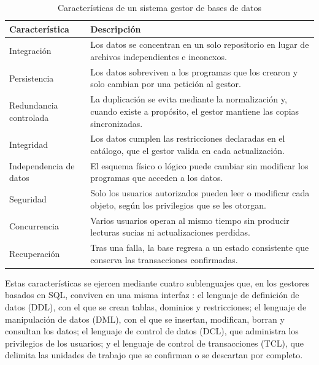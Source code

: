 \begin{table}[H]
    \centering
    \small
    \begin{tabularx}{\textwidth}
        {
            >{\RaggedRight\arraybackslash}p{3.4cm}
            >{\RaggedRight\arraybackslash}X
        }
        \toprule
        \textbf{Característica} & \textbf{Descripción} \\
        \midrule
        Integración & Los datos se concentran en un solo repositorio en lugar de archivos independientes e inconexos. \\
        Persistencia & Los datos sobreviven a los programas que los crearon y solo cambian por una petición al gestor. \\
        Redundancia controlada & La duplicación se evita mediante la normalización y, cuando existe a propósito, el gestor mantiene las copias sincronizadas. \\
        Integridad & Los datos cumplen las restricciones declaradas en el catálogo, que el gestor valida en cada actualización. \\
        Independencia de datos & El esquema físico o lógico puede cambiar sin modificar los programas que acceden a los datos. \\
        Seguridad & Solo los usuarios autorizados pueden leer o modificar cada objeto, según los privilegios que se les otorgan. \\
        Concurrencia & Varios usuarios operan al mismo tiempo sin producir lecturas sucias ni actualizaciones perdidas. \\
        Recuperación & Tras una falla, la base regresa a un estado consistente que conserva las transacciones confirmadas. \\
        \bottomrule
    \end{tabularx}
    \captionsetup{labelfont=bf, textfont=it, labelsep=newline, justification=raggedright, singlelinecheck=false}
    \caption{Características de un sistema gestor de bases de datos}
    \label{tab:caracteristicas-sgbd}
\end{table}

Estas características se ejercen mediante cuatro sublenguajes que, en los gestores basados en SQL, conviven en una misma interfaz \parencites[pp.~38--41]{elmasri_navathe}[pp.~42--44]{silberschatz_dbconcepts}: el lenguaje de definición de datos (DDL), con el que se crean tablas, dominios y restricciones; el lenguaje de manipulación de datos (DML), con el que se insertan, modifican, borran y consultan los datos; el lenguaje de control de datos (DCL), que administra los privilegios de los usuarios; y el lenguaje de control de transacciones (TCL), que delimita las unidades de trabajo que se confirman o se descartan por completo.


